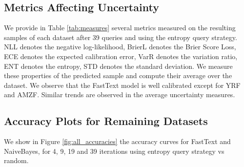 \documentclass[11pt,a4paper]{article}
\begin{document}
\subsection{Metrics Affecting Uncertainty}
We provide in Table \ref{tab:measures} several metrics measured on the resulting samples of each dataset after 39 queries and using the entropy query strategy. NLL denotes the negative log-likelihood, BrierL denotes the Brier Score Loss, ECE denotes the expected calibration error, VarR denotes the variation ratio, ENT denotes the entropy, STD denotes the standard deviation. We measure these properties of the predicted sample and compute their average over the dataset. We observe that the FastText model is well calibrated except for YRF and AMZF. Similar trends are observed in the average uncertainty measures.
\subsection{Accuracy Plots for Remaining Datasets}
We show in Figure \ref{fig:all_accuracies} the accuracy curves for FastText and NaiveBayes, for 4, 9, 19 and 39 iterations using entropy query strategy vs random.
\end{document}
